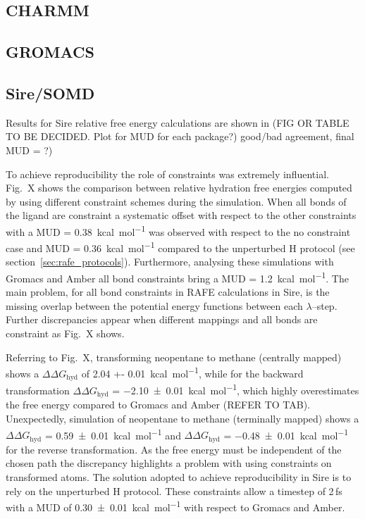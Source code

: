 \documentclass[journal=jctcce,manuscript=article]{achemso}
\begin{document}
\subsection{CHARMM}
\label{sec:charmm-results}



\subsection{GROMACS}
\label{sec:gromacs-results}


\subsection{Sire/SOMD}
\label{sec:somd-results}

Results for Sire relative free energy calculations are shown in (FIG OR TABLE
TO BE DECIDED. Plot for MUD for each package?) good/bad agreement, final MUD =
?)

To achieve reproducibility the role of constraints was extremely
influential.  Fig.\ X shows the comparison between relative hydration
free energies computed by using different constraint schemes during
the simulation. When all bonds of the ligand are constraint a
systematic offset with respect to the other constraints with a MUD =
\SI{0.38}{kcal.mol^{-1}} was observed with respect to the no
constraint case and MUD = \SI{0.36}{kcal.mol^{-1}} compared to the
unperturbed H protocol (see section~\ref{sec:rafe_protocols}).
Furthermore, analysing these simulations with Gromacs and Amber all
bond constraints bring a MUD = \SI{1.2}{kcal.mol^{-1}}. The main
problem, for all bond constraints in RAFE calculations in Sire, is the
missing overlap between the potential energy functions between each
$\lambda$--step.  Further discrepancies appear when different
mappings and all bonds are constraint as Fig.\ X shows.

Referring to Fig.\ X, transforming neopentane to methane (centrally
mapped) shows a $\Delta\Delta G_{\mathrm{hyd}}$ of \SI{2.04 +-
  0.01}{kcal.mol^{-1}}, while for the backward transformation
$\Delta\Delta G_{\mathrm{hyd}}$ = \SI{-2.10 +- 0.01}{kcal.mol^{-1}},
which highly overestimates the free energy compared to Gromacs and
Amber (REFER TO TAB). Unexpectedly, simulation of neopentane to
methane (terminally mapped) shows a $\Delta\Delta G_{\mathrm{hyd}}$ =
\SI{0.59 +- 0.01}{kcal.mol^{-1}} and $\Delta\Delta G_{\mathrm{hyd}}$ =
\SI{-0.48 +- 0.01}{kcal.mol^{-1}} for the reverse transformation.  As
the free energy must be independent of the chosen path the discrepancy
highlights a problem with using constraints on transformed atoms.  The
solution adopted to achieve reproducibility in Sire is to rely on the
unperturbed H protocol.  These constraints allow a timestep of 2\,fs
with a MUD of \SI{0.30 +- 0.01}{kcal.mol^{-1}} with respect to Gromacs
and Amber.
\end{document}
